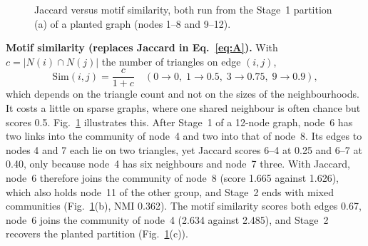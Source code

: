 \documentclass[conference]{IEEEtran}
\begin{document}
\begin{figure}[t]
\caption{Jaccard versus motif similarity, both run from the Stage~1 partition (a) of a planted graph (nodes 1--8 and 9--12).}
\label{fig:m1}
\end{figure}


\textbf{Motif similarity (replaces Jaccard in Eq.~\eqref{eq:A}).} With $c=|N(i)\cap N(j)|$ the number of triangles on edge $(i,j)$,
\begin{equation}
\mathrm{Sim}(i,j)=\frac{c}{1+c}\quad(0\to0,\;1\to0.5,\;3\to0.75,\;9\to0.9),\label{eq:motif}
\end{equation}
which depends on the triangle count and not on the sizes of the neighbourhoods. It costs a little on sparse graphs, where one shared neighbour is often chance but scores 0.5. Fig.~\ref{fig:m1} illustrates this. After Stage~1 of a 12-node graph, node~6 has two links into the community of node~4 and two into that of node~8. Its edges to nodes 4 and 7 each lie on two triangles, yet Jaccard scores 6--4 at 0.25 and 6--7 at 0.40, only because node~4 has six neighbours and node~7 three. With Jaccard, node~6 therefore joins the community of node~8 (score 1.665 against 1.626), which also holds node~11 of the other group, and Stage~2 ends with mixed communities (Fig.~\ref{fig:m1}(b), NMI 0.362). The motif similarity scores both edges 0.67, node~6 joins the community of node~4 (2.634 against 2.485), and Stage~2 recovers the planted partition (Fig.~\ref{fig:m1}(c)).
\end{document}

